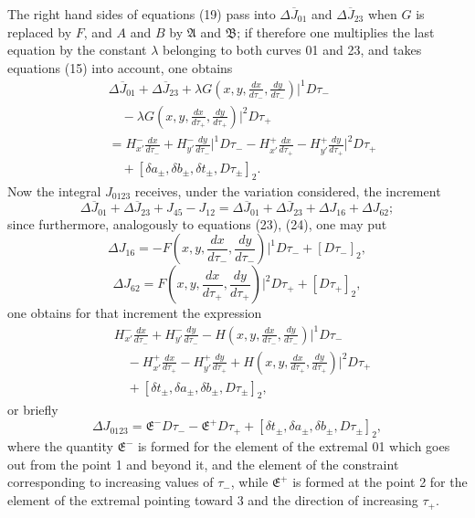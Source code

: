 \documentclass[11pt,a4paper,leqno]{article}
\begin{document}
The right hand sides of equations (19) pass into $\Delta\overline J_{01}$ and $\Delta\overline J_{23}$ when $G$ is replaced by $F$, and $A$ and $B$ by $\mathfrak A$ and $\mathfrak B$; if therefore one multiplies the last equation by the constant $\lambda$ belonging to both curves 01 and 23, and takes equations (15) into account, one obtains
\[
\begin{aligned}
&\Delta\overline J_{01}+\Delta\overline J_{23}
+\lambda G\left(x,y,\frac{dx}{d\tau_-},\frac{dy}{d\tau_-}\right)\bigg|^1D\tau_-\\
&\quad -\lambda G\left(x,y,\frac{dx}{d\tau_+},\frac{dy}{d\tau_+}\right)\bigg|^2D\tau_+\\
&=H_{x'}^-\frac{dx}{d\tau_-}+H_{y'}^-\frac{dy}{d\tau_-}\bigg|^1D\tau_-
-H_{x'}^+\frac{dx}{d\tau_+}-H_{y'}^+\frac{dy}{d\tau_+}\bigg|^2D\tau_+\\
&\quad +[\delta a_\pm,\delta b_\pm,\delta t_\pm,D\tau_\pm]_2.
\end{aligned}
\]
Now the integral $J_{0123}$ receives, under the variation considered, the increment
\[
\Delta\overline J_{01}+\Delta\overline J_{23}+J_{45}-J_{12}
=\Delta\overline J_{01}+\Delta\overline J_{23}+\Delta J_{16}+\Delta J_{62};
\]
since furthermore, analogously to equations (23), (24), one may put
\[
\Delta J_{16}=-F\left(x,y,\frac{dx}{d\tau_-},\frac{dy}{d\tau_-}\right)\bigg|^1D\tau_-+[D\tau_-]_2,
\]
\[
\Delta J_{62}=F\left(x,y,\frac{dx}{d\tau_+},\frac{dy}{d\tau_+}\right)\bigg|^2D\tau_+ +[D\tau_+]_2,
\]
one obtains for that increment the expression
\[
\begin{aligned}
&H_{x'}^-\frac{dx}{d\tau_-}+H_{y'}^-\frac{dy}{d\tau_-}
-H\left(x,y,\frac{dx}{d\tau_-},\frac{dy}{d\tau_-}\right)\bigg|^1D\tau_-\\
&\quad -H_{x'}^+\frac{dx}{d\tau_+}-H_{y'}^+\frac{dy}{d\tau_+}
+H\left(x,y,\frac{dx}{d\tau_+},\frac{dy}{d\tau_+}\right)\bigg|^2D\tau_+\\
&\quad +[\delta t_\pm,\delta a_\pm,\delta b_\pm,D\tau_\pm]_2,
\end{aligned}
\]
or briefly
\[
\Delta J_{0123}=\mathfrak E^-D\tau_- -\mathfrak E^+D\tau_+ +[\delta t_\pm,\delta a_\pm,\delta b_\pm,D\tau_\pm]_2,
\]
where the quantity $\mathfrak E^-$ is formed for the element of the extremal 01 which goes out from the point 1 and beyond it, and the element of the constraint corresponding to increasing values of $\tau_-$, while $\mathfrak E^+$ is formed at the point 2 for the element of the extremal pointing toward 3 and the direction of increasing $\tau_+$.
\end{document}
